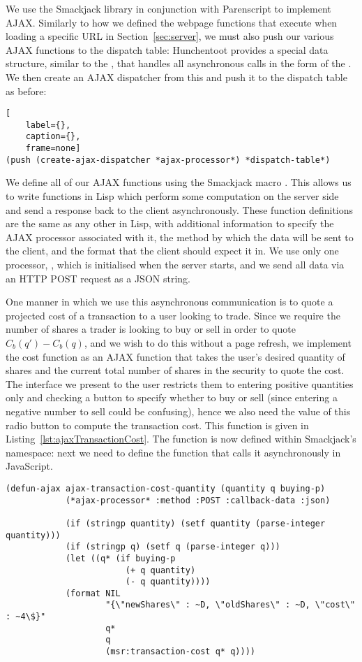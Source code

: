 We use the Smackjack library in conjunction with Parenscript to implement AJAX.
Similarly to how we defined the webpage functions that execute when loading a
specific URL in Section~\ref{sec:server}, we must also push our various AJAX
functions to the dispatch table: Hunchentoot provides a special data structure,
similar to the , that handles all asynchronous calls in the
form of the . We then create an AJAX dispatcher from this
and push it to the dispatch table as before: 

\begin{lstlisting}[
	label={},
	caption={},
	frame=none]
(push (create-ajax-dispatcher *ajax-processor*) *dispatch-table*)
\end{lstlisting}

We define all of our AJAX functions using the Smackjack macro
. This allows us to write functions in Lisp which perform some
computation on the server side and send a response back to the client
asynchronously. These function definitions are the same as any other in Lisp,
with additional information to specify the AJAX processor associated with it,
the method by which the data will be sent to the client, and the format that
the client should expect it in. We use only one processor,
, which is initialised when the server starts, and we
send all data via an HTTP POST request as a JSON string.

One manner in which we use this asynchronous communication is to quote a
projected cost of a transaction to a user looking to trade. Since we require
the number of shares a trader is looking to buy or sell in order to quote
$C_b(q')-C_b(q)$, and we wish to do this without a page refresh, we implement
the cost function as an AJAX function that takes the user's desired quantity of
shares and the current total number of shares in the security to quote the
cost. The interface we present to the user restricts them to entering positive
quantities only and checking a button to specify whether to buy or sell (since
entering a negative number to sell could be confusing), hence we also need the
value of this radio button to compute the transaction cost. This function is
given in Listing~\ref{lst:ajaxTransactionCost}. The function is now defined
within Smackjack's namespace: next we need to define the function that calls it
asynchronously in JavaScript.

\begin{lstlisting}[float,
	label={lst:ajaxTransactionCost},
	caption={Defining an AJAX function for computing transaction cost using
	Smackjack}]
(defun-ajax ajax-transaction-cost-quantity (quantity q buying-p)
			(*ajax-processor* :method :POST :callback-data :json)

			(if (stringp quantity) (setf quantity (parse-integer quantity)))
			(if (stringp q) (setf q (parse-integer q)))
			(let ((q* (if buying-p
						(+ q quantity)
						(- q quantity))))
			(format NIL 
					"{\"newShares\" : ~D, \"oldShares\" : ~D, \"cost\" : ~4\$}"
					q*
					q
					(msr:transaction-cost q* q))))
\end{lstlisting}

